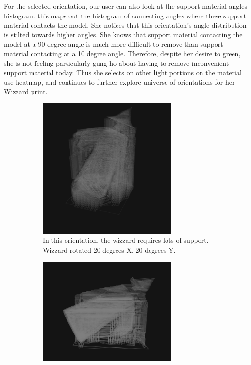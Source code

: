 \documentclass{sigchi}
\begin{document}
For the selected orientation, our user can also look at the support material angles histogram: this maps out the histogram of connecting angles where these support material contacts the model. She notices that this orientation's angle distribution is stilted towards higher angles.  She knows that support material contacting the model at a 90 degree angle is much more difficult to remove than support material contacting at a 10 degree angle. Therefore, despite her desire to green, she is not feeling particularly gung-ho about having to remove inconvenient support material today. Thus she selects on other light portions on the material use heatmap, and continues to further explore universe of orientations for her Wizzard print.

\begin{figure}
        \centering
        \begin{subfigure}[b]{0.3\textwidth}
                \includegraphics[width=2.75in]{images/wizzard-lotssupport}
                \caption{In this orientation, the wizzard requires lots of support.  Wizzard rotated 20 degrees X, 20 degrees Y.}
                \label{fig:lots}
        \end{subfigure}
        \begin{subfigure}[b]{0.3\textwidth}
                \includegraphics[width=2.75in]{images/wizzard-somesupport}

\end{subfigure}
\end{figure}
\end{document}
